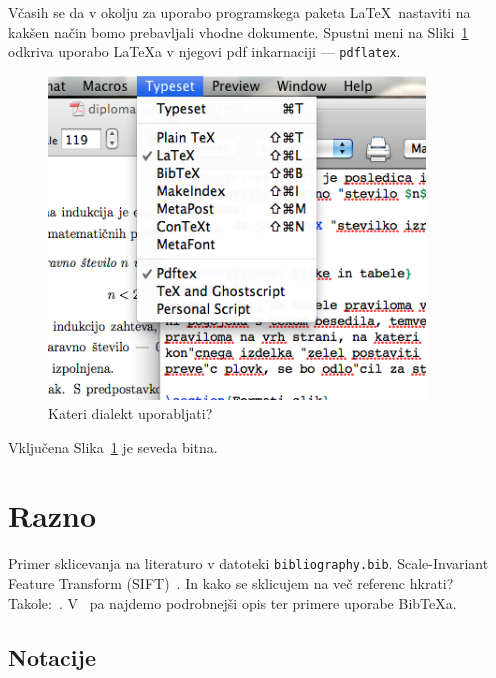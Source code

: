 \documentclass[a4paper, 12pt]{book}
\newcommand{\BibTeX}{{\sc Bib}\TeX}
\begin{document}
Včasih se da v okolju za uporabo programskega paketa \LaTeX\ nastaviti na kakšen način bomo prebavljali vhodne dokumente. Spustni meni na Sliki~\ref{pic2} odkriva uporabo \LaTeX{}a v njegovi pdf inkarnaciji --- {\tt pdflatex}.
\begin{figure}
\begin{center}
\includegraphics[width=10cm]{pic2.png}
\end{center}
\caption{Kateri dialekt uporabljati?}
\label{pic2}
\end{figure}
Vključena Slika~\ref{pic2} je seveda bitna.



\chapter{Razno}
\label{ch:razno}

Primer sklicevanja na literaturo v datoteki {\tt bibliography.bib}. Scale-Invariant Feature Transform (SIFT)~\cite{Lowe}. In kako se sklicujem na več referenc hkrati? Takole:~\cite{Fortnow,Knuth,Lamport,licence}. V~\cite{ubi} pa najdemo podrobnejši opis ter primere uporabe \BibTeX{}a.

\section{Notacije}
\label{sec:notacije}
\end{document}
